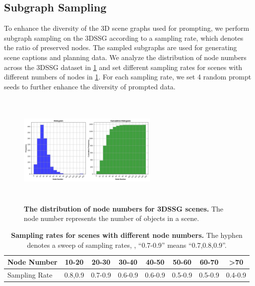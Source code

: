 \subsection{Subgraph Sampling}\label{app:subgraph_sampling}
To enhance the diversity of the 3D scene graphs used for prompting, we perform subgraph sampling on the 3DSSG according to a sampling rate, which denotes the ratio of preserved nodes. The sampled subgraphs are used for generating scene captions and planning data. We analyze the distribution of node numbers across the 3DSSG dataset in \cref{fig:node_distribution} and set different sampling rates for scenes with different numbers of nodes in \cref{tab:sampling_rate}. For each sampling rate, we set 4 random prompt seeds to further enhance the diversity of prompted data.
\begin{figure}[t!]
\centering
\includegraphics[width=0.6\textwidth,height=5.5cm]{figs/node_histogram.png}%
  \caption{\textbf{The distribution of node numbers for 3DSSG scenes.} The node number represents the number of objects in a scene.
  }
  \label{fig:node_distribution}
\end{figure}

\begin{table}[t!]
    \centering
    \small
    \caption{\textbf{Sampling rates for scenes with different node numbers.} The hyphen denotes a sweep of sampling rates, \eg, ``0.7-0.9'' means ``0.7,0.8,0.9''.}
    \begin{tabular}{l|c c c c c c c}
        \toprule
        \textbf{Node Number} & \textbf{10-20} & \textbf{20-30} & \textbf{30-40} & \textbf{40-50} & \textbf{50-60} &\textbf{60-70} &\textbf{>70} \\
        \midrule
        Sampling Rate & 0.8,0.9 & 0.7-0.9 & 0.6-0.9 & 0.6-0.9 & 0.5-0.9 & 0.5-0.9 & 0.4-0.9\\
        \bottomrule
    \end{tabular}
    \label{tab:sampling_rate}
\end{table}

